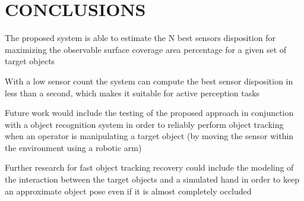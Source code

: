 \section{\uppercase{Conclusions}}\label{sec:conclusions}

\noindent The proposed system is able to estimate the N best sensors disposition for maximizing the observable surface coverage area percentage for a given set of target objects

With a low sensor count the system can compute the best sensor disposition in less than a second, which makes it suitable for active perception tasks

Future work would include the testing of the proposed approach in conjunction with a object recognition system in order to reliably perform object tracking when an operator is manipulating a target object (by moving the sensor within the environment using a robotic arm)

Further research for fast object tracking recovery could include the modeling of the interaction between the target objects and a simulated hand in order to keep an approximate object pose even if it is almost completely occluded
